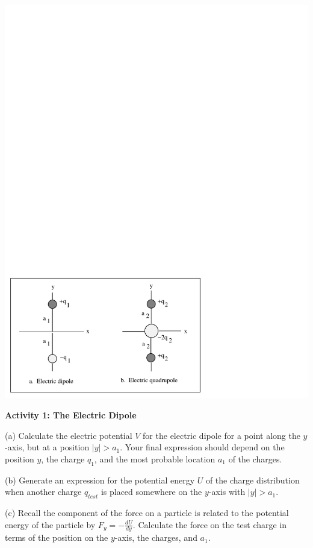 \vspace{0.3cm}
{\centering \includegraphics{charge_dist_water_mol/charge_dist_water_mol_fig_1.pdf} \par}
\vspace{0.3cm}

\textbf{Activity 1: The Electric Dipole }

(a) Calculate the electric potential $V$ for the electric dipole for
a point along the $y$-axis, but at a position $\left| y\right| >
a_1$. Your final expression should depend on the position
$y$, the charge $q_1$, and the most probable location $a_1$ of the
charges.
\answerspace{20mm}

\pagebreak[2]
(b) Generate an expression for the potential energy $U$ of the charge
distribution when another charge $q_{test}$ is placed somewhere
on the $y$-axis with $\left| y\right|  > a_1$.
\answerspace{20mm}

(c) Recall the component of the force on a particle is related to
the potential energy of the particle by $F_y  = - \frac{dU}{dy}$.
Calculate the force on the test charge in terms of the position on
the $y$-axis, the charges, and $a_1$.
\answerspace{20mm}

